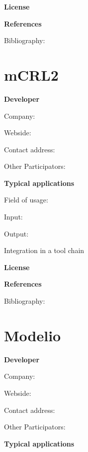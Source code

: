 \documentclass{./template/openetcs_report}
\begin{document}
	\textbf{License}


	\textbf{References}

	Bibliography:


\section{mCRL2}

	\textbf{Developer}

	Company: 

	Webside:

	Contact address:

	Other  Participators:



	\textbf{Typical applications}

	Field of usage:


	Input:

	Output:





	Integration in a tool chain



	\textbf{License}


	\textbf{References}

	Bibliography:


\section{Modelio}

	\textbf{Developer}

	Company: 

	Webside:

	Contact address:

	Other  Participators:



	\textbf{Typical applications}
\end{document}
